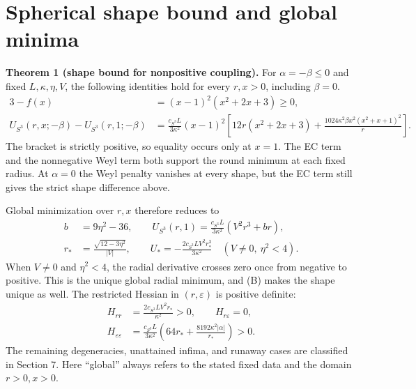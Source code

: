\section{Spherical shape bound and global minima}
\label{sec:revised5}

\textbf{Theorem 1 (shape bound for nonpositive coupling).} For $\alpha=-\beta\le0$ and fixed $L,\kappa,\eta,V$, the following identities hold for every $r,x>0$, including $\beta=0$.
\begin{equation}
\begin{aligned}
3-f(x)&=(x-1)^2(x^2+2x+3)\ge0,\\
U_{S^3}(r,x;-\beta)-U_{S^3}(r,1;-\beta)
&=\frac{c_{S^3}L}{3\kappa^2}(x-1)^2
\left[12r(x^2+2x+3)
+\frac{1024\kappa^2\beta x^2(x^2+x+1)^2}{r}\right].
\end{aligned}
\tag{B}\label{eq:B}
\end{equation}
The bracket is strictly positive, so equality occurs only at $x=1$. The EC term and the nonnegative Weyl term both support the round minimum at each fixed radius. At $\alpha=0$ the Weyl penalty vanishes at every shape, but the EC term still gives the strict shape difference above.

Global minimization over $r,x$ therefore reduces to
\begin{equation}
\begin{aligned}
b&=9\eta^2-36,\qquad
U_{S^3}(r,1)=\frac{c_{S^3}L}{3\kappa^2}(V^2r^3+br),\\
r_*&=\frac{\sqrt{12-3\eta^2}}{\lvert V\rvert},
\qquad
U_*=-\frac{2c_{S^3}L V^2r_*^3}{3\kappa^2}
\quad(V\ne0,\ \eta^2<4).
\end{aligned}
\tag{MIN}\label{eq:MIN}
\end{equation}
When $V\ne0$ and $\eta^2<4$, the radial derivative crosses zero once from negative to positive. This is the unique global radial minimum, and (B) makes the shape unique as well. The restricted Hessian in $(r,\varepsilon)$ is positive definite:
\begin{equation}
\begin{aligned}
H_{rr}&=\frac{2c_{S^3}L V^2r_*}{\kappa^2}>0,
\qquad H_{r\varepsilon}=0,\\
H_{\varepsilon\varepsilon}
&=\frac{c_{S^3}L}{3\kappa^2}
\left(64r_*+\frac{8192\kappa^2\lvert\alpha\rvert}{r_*}\right)>0.
\end{aligned}
\tag{H}\label{eq:H}
\end{equation}
The remaining degeneracies, unattained infima, and runaway cases are classified in Section 7. Here ``global'' always refers to the stated fixed data and the domain $r>0,x>0$.

